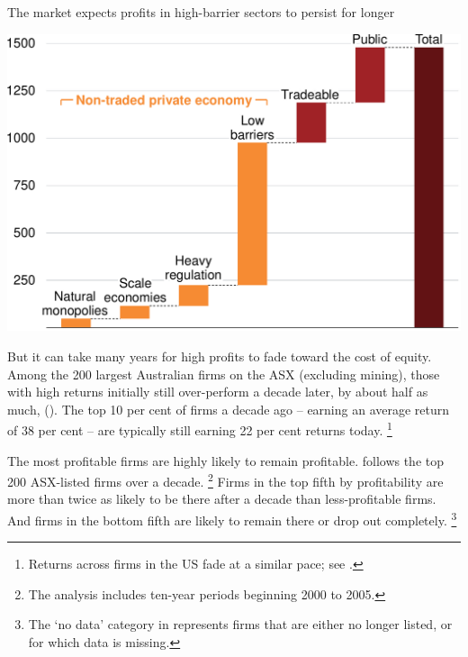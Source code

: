 {
\caption{The market expects profits in high-barrier sectors to persist for longer \label{fig:QvsROE}}
  \includegraphics[page=23]{atlas/Charts} 
}

But it can take many years for high profits to fade toward the cost of equity. Among the 200 largest Australian firms on the ASX (excluding mining), those with high returns initially still over-perform a decade later, by about half as much,  (). The top 10 per cent of firms a decade ago -- earning an average return of 38 per cent -- are typically still earning 22 per cent returns today.%
    \footnote{Returns across firms in the US fade at a similar pace; see \textcite{Koller_ROIC_2010}.}

The most profitable firms are highly likely to remain profitable.
 follows the top 200 ASX-listed firms over a decade.%
    \footnote{The analysis includes ten-year periods beginning 2000 to 2005.}
Firms in the top fifth by profitability are more than twice as likely to be there after a decade than less-profitable firms. And firms in the bottom fifth are likely to remain there or drop out completely.%
    \footnote{The `no data' category in  represents firms that are either no longer listed, or for which data is missing.}

